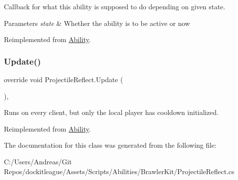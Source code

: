 Callback for what this ability is supposed to do depending on given state. 


\begin{DoxyParams}{Parameters}
{\em state} & Whether the ability is to be active or now\\
\hline
\end{DoxyParams}


Reimplemented from \hyperlink{class_ability_a18f5361c45dc334b541892880382c098}{Ability}.

\hypertarget{class_projectile_reflect_a81fc744408af168fb772d1c1f70d6f74}{}\label{class_projectile_reflect_a81fc744408af168fb772d1c1f70d6f74} 
\subsubsection{\texorpdfstring{Update()}{Update()}}
{\footnotesize\ttfamily override void Projectile\+Reflect.\+Update (\begin{DoxyParamCaption}{ }\end{DoxyParamCaption})\hspace{0.3cm}{\ttfamily [protected]}, {\ttfamily [virtual]}}



Runs on every client, but only the local player has cooldown initialized. 



Reimplemented from \hyperlink{class_ability_a88d799f38be464be5f0a9a315efb2d0b}{Ability}.



The documentation for this class was generated from the following file\+:\begin{DoxyCompactItemize}
\item 
C\+:/\+Users/\+Andreas/\+Git Repos/dockitleague/\+Assets/\+Scripts/\+Abilities/\+Brawler\+Kit/Projectile\+Reflect.\+cs\end{DoxyCompactItemize}
